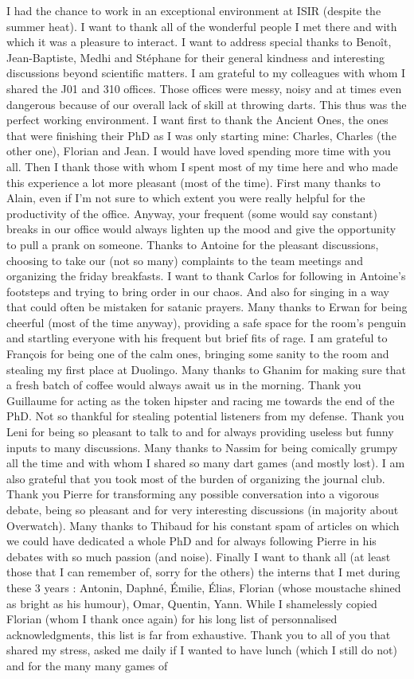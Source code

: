 I had the chance to work in an exceptional environment at ISIR (despite the summer heat). I want to thank all of the wonderful people I met there and with which it was a pleasure to interact. I want to address special thanks to Benoît, Jean-Baptiste, Medhi and Stéphane for their general kindness and interesting discussions beyond scientific matters. I am grateful to my colleagues with whom I shared the J01 and 310 offices. Those offices were messy, noisy and at times even dangerous because of our overall lack of skill at throwing darts. This thus was the perfect working environment. I want first to thank the Ancient Ones, the ones that were finishing their PhD as I was only starting mine: Charles, Charles (the other one), Florian and Jean. I would have loved spending more time with you all. Then I thank those with whom I spent most of my time here and who made this experience a lot more pleasant (most of the time). First many thanks to Alain, even if I'm not sure to which extent you were really helpful for the productivity of the office. Anyway, your frequent (some would say constant) breaks in our office would always lighten up the mood and give the opportunity to pull a prank on someone. Thanks to Antoine for the pleasant discussions, choosing to take our (not so many) complaints to the team meetings and organizing the friday breakfasts. I want to thank Carlos for following in Antoine's footsteps and trying to bring order in our chaos. And also for singing in a way that could often be mistaken for satanic prayers. Many thanks to Erwan for being cheerful (most of the time anyway), providing a safe space for the room's penguin and startling everyone with his frequent but brief fits of rage. I am grateful to François for being one of the calm ones, bringing some sanity to the room and stealing my first place at Duolingo. Many thanks to Ghanim for making sure that a fresh batch of coffee would always await us in the morning. Thank you Guillaume for acting as the token hipster and racing me towards the end of the PhD. Not so thankful for stealing potential listeners from my defense. Thank you Leni for being so pleasant to talk to and for always providing useless but funny inputs to many discussions. Many thanks to Nassim for being comically grumpy all the time and with whom I shared so many dart games (and mostly lost). I am also grateful that you took most of the burden of organizing the journal club. Thank you Pierre for transforming any possible conversation into a vigorous debate, being so pleasant and for very interesting discussions (in majority about Overwatch). Many thanks to Thibaud for his constant spam of articles on which we could have dedicated a whole PhD and for always following Pierre in his debates with so much passion (and noise). Finally I want to thank all (at least those that I can remember of, sorry for the others) the interns that I met during these 3 years : Antonin, Daphné, Émilie, Élias, Florian (whose moustache shined as bright as his humour), Omar, Quentin, Yann. While I shamelessly copied Florian (whom I thank once again) for his long list of personnalised acknowledgments, this list is far from exhaustive. Thank you to all of you that shared my stress, asked me daily if I wanted to have lunch (which I still do not) and for the many many games of 